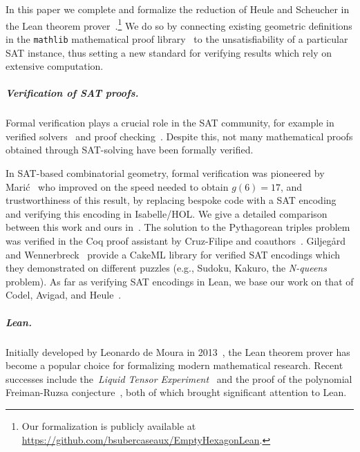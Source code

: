 
In this paper we complete and formalize the reduction of Heule and Scheucher in the Lean theorem prover~\cite{demouraLeanTheoremProver2015}.\footnote{Our formalization is publicly available at \url{https://github.com/bsubercaseaux/EmptyHexagonLean}.}
We do so by connecting existing geometric definitions
in the \texttt{mathlib} mathematical proof library~\cite{The_mathlib_Community_2020}
to the unsatisfiability of a particular SAT instance, thus setting a new standard for verifying results which rely on extensive computation.

\subparagraph*{Verification of SAT proofs.}
Formal verification plays a crucial role in the SAT community,
for example in verified solvers~\cite{10maric_formal_verification_modern_sat_solver_shallow_embedding_isabelle_hol,oeVersatVerifiedModern2012,skotam_creusat_2022}
and proof checking~\cite{lammichEfficientVerifiedSAT2020,tanVerifiedPropagationRedundancy2023}.
Despite this,
not many mathematical proofs obtained through SAT-solving
have been formally verified.

In SAT-based combinatorial geometry,
formal verification was pioneered by Marić~\cite{19maric_fast_formal_proof_erdos_szekeres_conjecture_convex_polygons_most_six_points}
who improved on the speed needed to obtain $g(6) = 17$,
and trustworthiness of this result,
by replacing bespoke code with a SAT encoding
and verifying this encoding in \textsf{Isabelle/HOL}.
We give a detailed comparison between this work and ours in~.
The solution to the Pythagorean triples problem
was verified in the \textsf{Coq} proof assistant
by Cruz-Filipe and coauthors~\cite{formalPythagoreanTriples,LPAR-21:Formally_Proving_Boolean_Pythagorean}.
Giljeg\r{a}rd and Wennerbreck~\cite{GilAndWennerbeck} provide a \textsf{CakeML} library
for verified SAT encodings
which they demonstrated on different puzzles
(e.g., Sudoku, Kakuro, the \emph{N-queens} problem).
As far as verifying SAT encodings in Lean,
we base our work on that of Codel, Avigad, and Heule~\cite{Cayden}.

\subparagraph*{Lean.}
Initially developed by Leonardo de Moura in 2013~\cite{demouraLeanTheoremProver2015},
the Lean theorem prover has become a popular choice for formalizing modern mathematical research.
Recent successes include the~\emph{Liquid Tensor Experiment}~\cite{Castelvecchi2021}
and the proof of the polynomial Freiman-Ruzsa conjecture~\cite{gowers2023conjecture, slomanATeamMathProves2023},
both of which brought significant attention to Lean.

